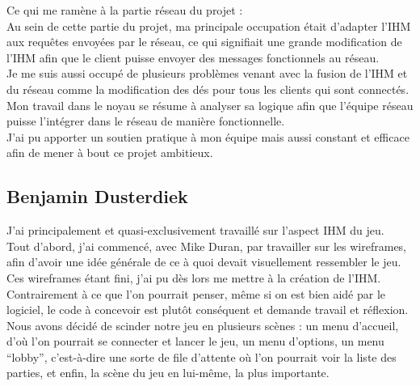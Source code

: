 \documentclass[a4paper,11pt]{article}
\begin{document}
	Ce qui me ramène à la partie réseau du projet : \\
	
Au sein de cette partie du projet, ma principale occupation était d'adapter l'IHM aux requêtes envoyées par le réseau, ce qui signifiait une grande modification de l'IHM afin que le client puisse envoyer des messages fonctionnels au réseau. \\

Je me suis aussi occupé de plusieurs problèmes venant avec la fusion de l'IHM et du réseau comme la modification des dés pour tous les clients qui sont connectés.
Mon travail dans le noyau se résume à analyser sa logique afin que l'équipe réseau puisse l'intégrer dans le réseau de manière fonctionnelle. \\

J'ai pu apporter un soutien pratique à mon équipe mais aussi constant et efficace afin de mener à bout ce projet ambitieux. \\


\subsection{Benjamin Dusterdiek}

J’ai principalement et quasi-exclusivement travaillé sur l’aspect IHM du jeu. \\

Tout d’abord, j’ai commencé, avec Mike Duran, par travailler sur les wireframes, afin d’avoir une idée générale de ce à quoi devait visuellement ressembler le jeu. Ces wireframes étant fini, j’ai pu dès lors me mettre à la création de l’IHM. Contrairement à ce que l’on pourrait penser, même si on est bien aidé par le logiciel, le code à concevoir est plutôt conséquent et demande travail et réflexion. Nous avons décidé de scinder notre jeu en plusieurs scènes : un menu d’accueil, d’où l’on pourrait se connecter et lancer le jeu, un menu d’options, un menu “lobby”, c’est-à-dire une sorte de file d’attente où l’on pourrait voir la liste des parties, et enfin, la scène du jeu en lui-même, la plus importante. \\
\end{document}
